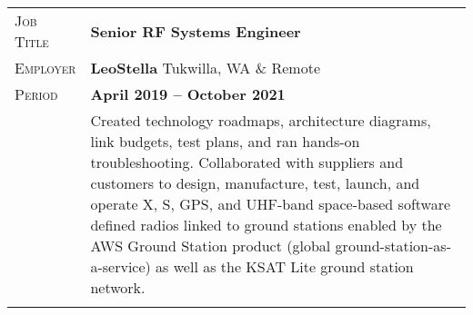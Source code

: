 \documentclass[a4paper, oneside, final]{scrartcl}
\newcommand{\gray}{\rowcolor[gray]{.90}} %
\begin{document}
\begin{center}
\begin{tabularx}{0.97\linewidth}{>{\raggedleft\scshape}p{2cm}X}
\gray Job Title & \textbf{Senior RF Systems Engineer}\\
\gray Employer & \textbf{LeoStella} \hfill Tukwilla, WA \& Remote\\
\gray Period & \textbf{April 2019 -- October 2021}\\
&
\vspace{-0.15 cm}
Created technology roadmaps, architecture diagrams, link budgets, test plans, and ran hands-on troubleshooting. Collaborated with suppliers and customers to design, manufacture, test, launch, and operate X, S, GPS, and UHF-band space-based software defined radios linked to ground stations enabled by the AWS Ground Station product (global ground-station-as-a-service) as well as the KSAT Lite ground station network.
\newline
\newline
\\
\\
\end{tabularx}


\end{center}
\end{document}
